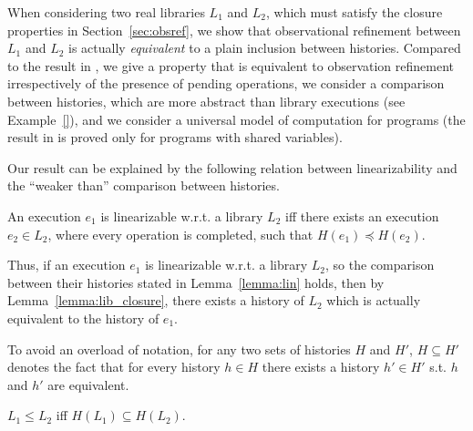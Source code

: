 When considering two real libraries $L_1$ and $L_2$, which must satisfy the closure 
properties in Section~\ref{sec:obsref}, we show that observational refinement between $L_1$ and $L_2$ is actually 
\emph{equivalent} to a plain inclusion between histories. Compared to the
result in \citet{journals/tcs/FilipovicORY10}, we give a property that is equivalent to observation refinement irrespectively of the
presence of pending operations, we consider a comparison between histories, which are more abstract 
than library executions (see Example~\ref{}), and we consider a universal model of computation for programs 
(the result in \citet{journals/tcs/FilipovicORY10} is proved only for programs with shared variables). 

Our result can be explained by the following relation between linearizability and the ``weaker than'' comparison between histories.

\begin{lemma}\label{lemma:lin}
An execution $e_1$ is linearizable w.r.t. a library $L_2$ iff there exists an execution $e_2\in L_2$, where every operation is completed, 
such that $H(e_1)\preceq H(e_2)$.
\end{lemma}



Thus, if an execution $e_1$ is linearizable w.r.t. a library $L_2$, so the comparison between their histories 
stated in Lemma~\ref{lemma:lin} holds, then by Lemma~\ref{lemma:lib_closure}, 
there exists a history of $L_2$ which is actually equivalent to the history of $e_1$.

To avoid an overload of notation, for any two sets of histories $H$ and $H'$, $H\subseteq H'$ 
denotes the fact that for every history $h\in H$ there exists a history $h'\in H'$ s.t. 
$h$ and $h'$ are equivalent.

\begin{theorem}

  $L_1 \leq L_2$ iff $H(L_1) \subseteq H(L_2)$.

\end{theorem}

